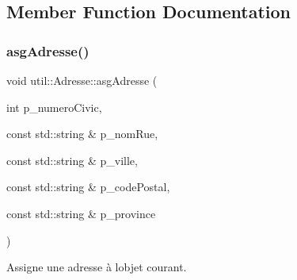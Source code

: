 \subsection{Member Function Documentation}
\mbox{\label{classutil_1_1Adresse_ab76bad0bb5679f6b091f1bd3b84c5c1b}} 
\subsubsection{\texorpdfstring{asg\+Adresse()}{asgAdresse()}}
{\footnotesize\ttfamily void util\+::\+Adresse\+::asg\+Adresse (\begin{DoxyParamCaption}\item[{int}]{p\+\_\+numero\+Civic,  }\item[{const std\+::string \&}]{p\+\_\+nom\+Rue,  }\item[{const std\+::string \&}]{p\+\_\+ville,  }\item[{const std\+::string \&}]{p\+\_\+code\+Postal,  }\item[{const std\+::string \&}]{p\+\_\+province }\end{DoxyParamCaption})}



Assigne une adresse à l\textquotesingle{}objet courant. 



